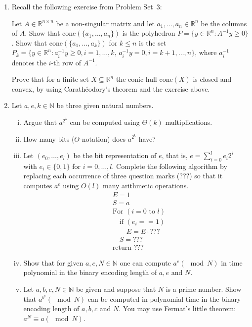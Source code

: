 \documentclass[11pt]{article}
\institute{\'Ecole Polytechnique F\'ed\'erale de Lausanne}
\newcommand{\setR}{\mathbb{R}}
\newcommand{\setN}{\mathbb{N}}
\renewcommand{\leq}{\leqslant}
\renewcommand{\geq}{\geqslant}
\newcommand{\cone}{\mathrm{cone}}
\begin{document}
\makeheader

\begin{enumerate}[1)]


\item Recall the following exercise from Problem Set~3:

	Let $A \in \setR^{n\times n}$ be a non-singular matrix and let
	$a_1,\ldots,a_n\in \setR^n$ be the columns of $A$.  Show that
	$\cone(\{a_1,\ldots,a_n\})$ is the polyhedron $P = \{ y \in \setR^n \colon
	A^{-1} y\geq0\}$. \label{conv:item:3} Show that $\cone(\{a_1,\ldots,a_k\})$ for
	$k\leq n$ is the set $P_k = \{y \in \setR^n \colon
	a_i^{-1} y\geq0, i=1,\ldots,k, \, a_i^{-1}y = 0, i=k+1,\ldots,n\}$, where
	$a_i^{-1}$ denotes the $i$-th row of $A^{-1}$. 

Prove that for a finite set $X\subseteq\setR^n$ the conic hull $\cone(X)$ is closed and convex, by using Carath\'eodory's theorem and the exercise above.


\item Let $a, e, k ∈ \setN$ be three given natural numbers.
\begin{enumerate}[i)]
\item Argue that $a^{2^k}$ can be computed using $Θ(k)$ multiplications.
\item How many bits ($Θ$-notation) does $a^{2^k}$ have?
\item Let $(e_0, \hdots, e_l)$ be the bit representation of $e$, that is, $e = \displaystyle\sum_{i= 0}^l e_i2^i$ with $e_i ∈ \{0, 1\}$ for $i= 0, \hdots, l$.
Complete the following algorithm by replacing each occurrence of three question marks (???) so
that it computes $a^e$ using $O(l)$ many arithmetic operations.
\begin{align*}
& E = 1\\
& S = a\\
&\text{For }(i=0 \text{ to }l) \\
& \quad \text{if  }(e_i == 1)\\
& \quad \quad E = E\cdot ??? \\
&\quad S = ??? \\
&\text{return }???
\end{align*}
\item Show that for given $a, e, N ∈ \setN$ one can compute $a^e (\mod N)$ in time polynomial in the binary
encoding length of $a, e$ and $N$.
\item Let $a, b, c, N ∈ \setN$ be given and suppose that $N$ is a prime number. Show that $a^{b^c} (\mod N)$ can
be computed in polynomial time in the binary encoding length of $a, b, c$ and $N$. You may use
Fermat’s little theorem: $a^N ≡ a (\mod N)$.
\end{enumerate}






\end{enumerate}
\end{document}
